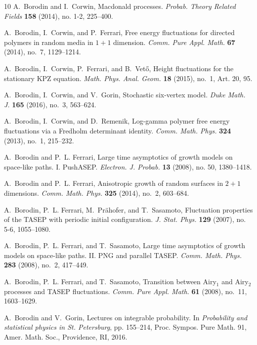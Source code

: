 \documentclass[10pt]{article}
\theoremstyle{plain}
\theoremstyle{definition}
\numberwithin{equation}{section}
\begin{document}
\begin{thebibliography}{10}
A.~Borodin and I.~Corwin, Macdonald processes. \emph{Probab. Theory Related
  Fields} \textbf{158} (2014), no. 1-2, 225--400.

A.~Borodin, I.~Corwin, and P.~Ferrari, Free energy fluctuations for directed
  polymers in random media in {$1+1$} dimension. \emph{Comm. Pure Appl. Math.}
  \textbf{67} (2014), no.~7, 1129--1214.

A.~Borodin, I.~Corwin, P.~Ferrari, and B.~Vet\H{o}, Height fluctuations for the
  stationary {KPZ} equation. \emph{Math. Phys. Anal. Geom.} \textbf{18} (2015),
  no.~1, Art. 20, 95.

A.~Borodin, I.~Corwin, and V.~Gorin, Stochastic six-vertex model. \emph{Duke
  Math. J.} \textbf{165} (2016), no.~3, 563--624.

A.~Borodin, I.~Corwin, and D.~Remenik, Log-gamma polymer free energy
  fluctuations via a {F}redholm determinant identity. \emph{Comm. Math. Phys.}
  \textbf{324} (2013), no.~1, 215--232.

A.~Borodin and P.~L. Ferrari, Large time asymptotics of growth models on
  space-like paths. {I}. {P}ush{ASEP}. \emph{Electron. J. Probab.} \textbf{13}
  (2008), no. 50, 1380--1418.

A.~Borodin and P.~L. Ferrari, Anisotropic growth of random surfaces in {$2+1$}
  dimensions. \emph{Comm. Math. Phys.} \textbf{325} (2014), no.~2, 603--684.

A.~Borodin, P.~L. Ferrari, M.~Pr{\"a}hofer, and T.~Sasamoto, Fluctuation
  properties of the {TASEP} with periodic initial configuration. \emph{J. Stat.
  Phys.} \textbf{129} (2007), no. 5-6, 1055--1080.

A.~Borodin, P.~L. Ferrari, and T.~Sasamoto, Large time asymptotics of growth
  models on space-like paths. {II}. {PNG} and parallel {TASEP}. \emph{Comm.
  Math. Phys.} \textbf{283} (2008), no.~2, 417--449.

A.~Borodin, P.~L. Ferrari, and T.~Sasamoto, Transition between {A}iry$_1$ and
  {A}iry$_2$ processes and {TASEP} fluctuations. \emph{Comm. Pure Appl. Math.}
  \textbf{61} (2008), no.~11, 1603--1629.

A.~Borodin and V.~Gorin, Lectures on integrable probability. In
  \emph{Probability and statistical physics in {S}t. {P}etersburg}, pp.
  155--214, Proc. Sympos. Pure Math. 91, Amer. Math. Soc., Providence, RI,
  2016.


\end{thebibliography}
\end{document}
